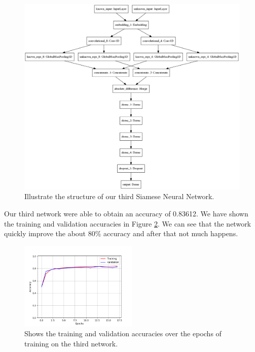 \begin{figure}
    \centering
    \includegraphics[width=\textwidth]{./pictures/method/network3.png}
    \caption{Illustrate the structure of our third Siamese Neural Network.}
    \label{fig:network3}
\end{figure}

Our third network were able to obtain an accuracy of 0.83612. We have shown the
training and validation accuracies in Figure \ref{fig:network_3_accuracies}. We
can see that the network quickly improve the about 80\% accuracy and after that
not much happens.

\begin{figure}
    \centering
    \includegraphics[width=0.5\textwidth]{./pictures/method/network_3_accuracies.png}
    \caption{Shows the training and validation accuracies over the epochs of
        training on the third network.}
    \label{fig:network_3_accuracies}
\end{figure}

